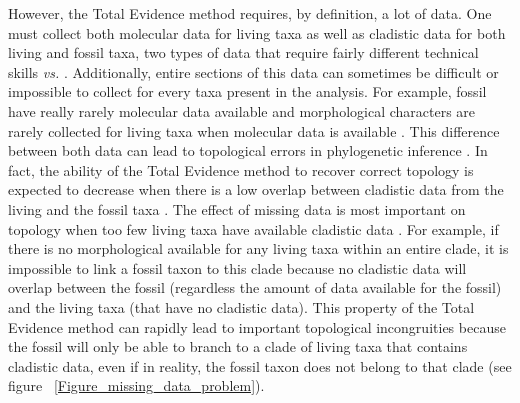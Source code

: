\documentclass[12pt,letterpaper]{article}
\begin{document}
However, the Total Evidence method requires, by definition, a lot of data.
One must collect both molecular data for living taxa as well as cladistic data for both living and fossil taxa, two types of data that require fairly different technical skills \citep[e.g.][]{meredithimpacts2011} \textit{vs.} \citep{O'Leary08022013}.
Additionally, entire sections of this data can sometimes be difficult or impossible to collect for every taxa present in the analysis.
For example, fossil have really rarely molecular data available and morphological characters are rarely collected for living taxa when molecular data is available \citep[e.g.][]{slaterphylogenetic2013,beckancient2014}.
This difference between both data can lead to topological errors in phylogenetic inference \citep{GuillermeCooper}.
In fact, the ability of the Total Evidence method to recover correct topology is expected to decrease when there is a low overlap between cladistic data from the living and the fossil taxa \citep{GuillermeCooper}.
The effect of missing data is most important on topology when too few living taxa have available cladistic data \citep{GuillermeCooper}.
For example, if there is no morphological available for any living taxa within an entire clade, it is impossible to link a fossil taxon to this clade because no cladistic data will overlap between the fossil (regardless the amount of data available for the fossil) and the living taxa (that have no cladistic data).
This property of the Total Evidence method can rapidly lead to important topological incongruities because the fossil will only be able to branch to a clade of living taxa that contains cladistic data, even if in reality, the fossil taxon does not belong to that clade \citep{GuillermeCooper} (see figure ~\ref{Figure_missing_data_problem}).
\end{document}
